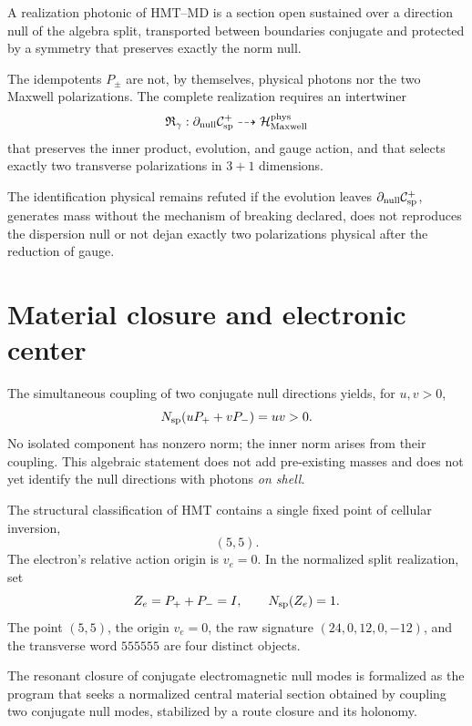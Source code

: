 \begin{definition}
\label{def:interfaz-fotonica-hmt-md}
A realization photonic of HMT--MD is a section open sustained over
a direction null of the algebra split, transported between boundaries
conjugate and protected by a symmetry that preserves exactly the norm
null.
\end{definition}

The idempotents \(P_\pm\) are not, by themselves, physical photons nor the two
Maxwell polarizations. The complete realization requires an
intertwiner
\[
 \mathfrak R_\gamma:
 \partial_{\rm null}\mathcal C_{\rm sp}^{+}
 \dashrightarrow\mathcal H_{\rm Maxwell}^{\rm phys}
\]
that preserves the inner product, evolution, and gauge action, and that
selects exactly two transverse polarizations in \(3+1\)
dimensions.

\begin{criterion}
\label{crit:sector-fotonico}
The identification physical remains refuted if the evolution leaves
\(\partial_{\rm null}\mathcal C_{\rm sp}^{+}\), generates mass without the mechanism
of breaking declared, does not reproduces the dispersion null or not dejan exactly
two polarizations physical after the reduction of gauge.
\end{criterion}

\section{Material closure and electronic center}
\label{sec:clausura-material-electron}

The simultaneous coupling of two conjugate null directions yields, for
\(u,v>0\),
\[
 N_{\rm sp}(uP_++vP_-)=uv>0.
\]
No isolated component has nonzero norm; the inner norm
arises from their coupling. This algebraic statement does not add pre-existing
masses and does not yet identify the null directions with photons
\emph{on shell}.

   The structural classification of HMT contains a single fixed point of cellular inversion,
\[
 (5,5).
\]
The electron's relative action origin is \(v_e=0\). In the normalized
split realization, set
\[
 Z_e=P_++P_-=I,
 \qquad
 N_{\rm sp}(Z_e)=1.
\]
The point \((5,5)\), the origin \(v_e=0\), the raw signature
\((24,0,12,0,-12)\), and the transverse word \(555555\) are four distinct
objects.

\begin{definition}
\label{def:candidato-clausura-electronica}
The resonant closure of conjugate electromagnetic null modes is
formalized as the program that seeks a normalized central material section
obtained by coupling two conjugate null modes, stabilized by
a route closure and its holonomy.
\end{definition}

